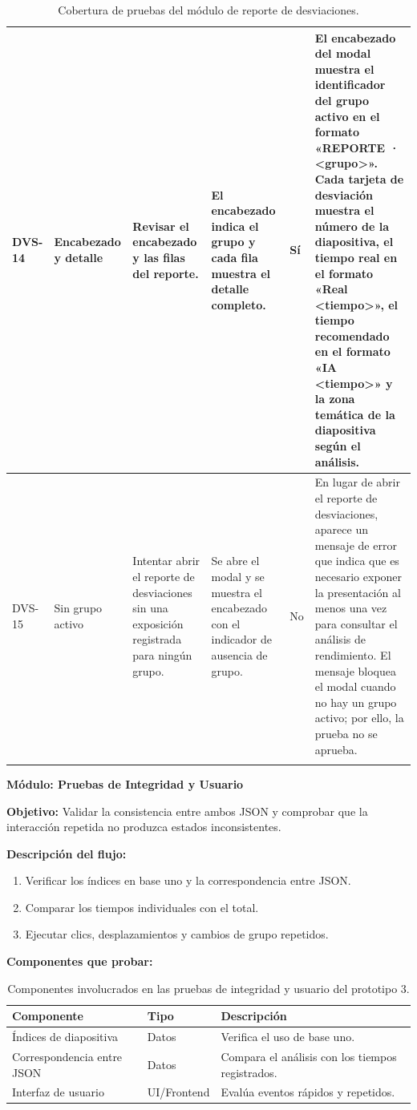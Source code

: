 \documentclass[11pt]{article}
\begin{document}
{\begin{longtable}{|L{1.0cm}|L{2.3cm}|L{3.2cm}|L{3.6cm}|L{1.4cm}|L{3.4cm}|}
DVS-14 & Encabezado y detalle & Revisar el encabezado y las filas del reporte. & El encabezado indica el grupo y cada fila muestra el detalle completo. & Sí & El encabezado del modal muestra el identificador del grupo activo en el formato «REPORTE · <grupo>». Cada tarjeta de desviación muestra el número de la diapositiva, el tiempo real en el formato «Real <tiempo>», el tiempo recomendado en el formato «IA <tiempo>» y la zona temática de la diapositiva según el análisis. \\ \hline
DVS-15 & Sin grupo activo & Intentar abrir el reporte de desviaciones sin una exposición registrada para ningún grupo. & Se abre el modal y se muestra el encabezado con el indicador de ausencia de grupo. & No & En lugar de abrir el reporte de desviaciones, aparece un mensaje de error que indica que es necesario exponer la presentación al menos una vez para consultar el análisis de rendimiento. El mensaje bloquea el modal cuando no hay un grupo activo; por ello, la prueba no se aprueba. \\ \hline
\caption{Cobertura de pruebas del módulo de reporte de desviaciones.}
\label{tab:cobertura-desviaciones}
\end{longtable}
}

\clearpage
\textbf{Módulo: Pruebas de Integridad y Usuario}

\textbf{Objetivo:} Validar la consistencia entre ambos JSON y comprobar que la interacción repetida no produzca estados inconsistentes.

\textbf{Descripción del flujo:}
\begin{enumerate}
\item Verificar los índices en base uno y la correspondencia entre JSON.
\item Comparar los tiempos individuales con el total.
\item Ejecutar clics, desplazamientos y cambios de grupo repetidos.
\end{enumerate}

\textbf{Componentes que probar:}
\begin{table}[H]
\centering
\begin{tabular}{|L{0.30\textwidth}|L{0.16\textwidth}|L{0.44\textwidth}|}
\hline
\textbf{Componente} & \textbf{Tipo} & \textbf{Descripción} \\ \hline
Índices de diapositiva & Datos & Verifica el uso de base uno. \\ \hline
Correspondencia entre JSON & Datos & Compara el análisis con los tiempos registrados. \\ \hline
Interfaz de usuario & UI/Frontend & Evalúa eventos rápidos y repetidos. \\ \hline
\end{tabular}
\caption{Componentes involucrados en las pruebas de integridad y usuario del prototipo 3.}
\label{tab:componentes-integridad-tt3}
\end{table}
\end{document}
